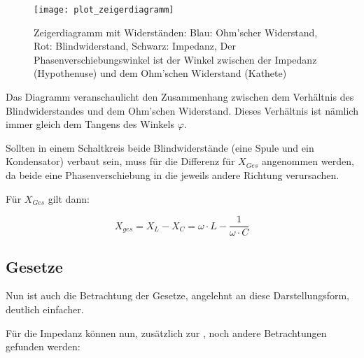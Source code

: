 \begin{figure}[h!]
	\centering
	\texttt{[image: plot\_zeigerdiagramm]}
	\begin{comment} Gnuplot:
set ylabel "X_L - X_C"
set label "R" at 2.5,-0.2
set label "Z" at 2.7,0.6
set arrow from graph 0,0.5 to graph 0,0.9 size screen 0.01,22,60 filled ls 1 front
set arrow from graph 0,0.5 to graph 0.85,0.5 size screen 0.01,22,60 filled ls 3 front
set arrow from graph 0,0.5 to graph 0.85,0.9 size screen 0.01,22,60 filled ls 2 front
set arrow from graph 0.85,0.5 to graph 0.85,0.9 size screen 0.01,22,60 filled ls 1 front
unset key
set output "plot_zeigerdiagramm.png"
plot 100
	\end{comment}
	\caption{Zeigerdiagramm mit Widerständen: Blau: Ohm'scher Widerstand, Rot: Blindwiderstand, Schwarz: Impedanz, Der Phasenverschiebungswinkel ist der Winkel zwischen der Impedanz (Hypothenuse) und dem Ohm'schen Widerstand (Kathete)}
\end{figure}


Das Diagramm veranschaulicht den Zusammenhang zwischen dem Verhältnis des Blindwiderstandes und dem Ohm'schen Widerstand. Dieses Verhältnis ist nämlich immer gleich dem Tangens des Winkels $\varphi$.

\begin{Anmerkung}
Sollten in einem Schaltkreis beide Blindwiderstände (eine Spule und ein Kondensator) verbaut sein, muss für die Differenz für $X_{Ges}$ angenommen werden, da beide eine Phasenverschiebung in die jeweils andere Richtung verursachen.
\end{Anmerkung}

\noindent Für $X_{Ges}$ gilt dann:

\begin{equation}	\label{eq:BlindwiderstandSumme}
	X_{ges} = X_L - X_C = \omega \cdot L - \frac{1}{\omega \cdot C}
\end{equation}



\subsection{Gesetze}	\label{subsec:WiderstaendeGesetzte}

Nun ist auch die Betrachtung der Gesetze, angelehnt an diese Darstellungsform, deutlich einfacher.


Für die Impedanz können nun, zusätzlich zur , noch andere Betrachtungen gefunden werden:

